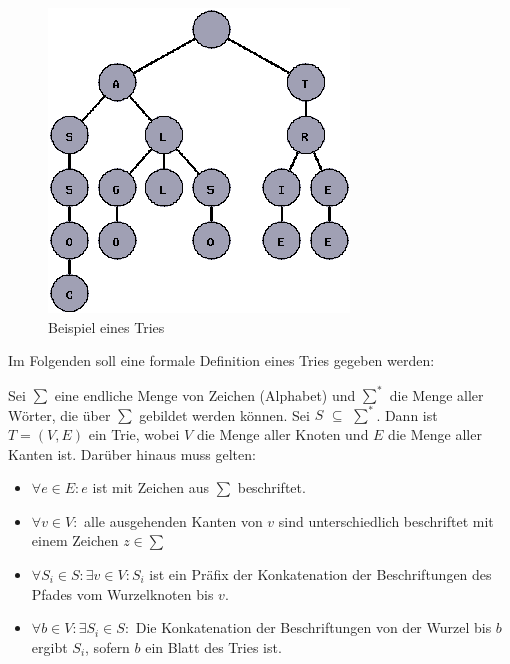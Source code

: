 \begin{figure}[H]
	\centering
	\includegraphics[scale=0.7]{../Abbildungen/trie.png}
	\caption{Beispiel eines Tries \cite{trie_Abb}}
\end{figure}

\newpage
Im Folgenden soll eine formale Definition eines Tries gegeben werden:
\newline
\begin{defi}
	Sei $\sum$ eine endliche Menge von Zeichen (Alphabet) und $\sum^{*}$ die Menge aller Wörter, die über $\sum$ gebildet werden können. Sei $S$ $\subseteq$ $\sum^{*}$. Dann ist $T = (V, E)$ ein Trie, wobei $V$ die Menge aller Knoten und $E$ die Menge aller Kanten ist. Darüber hinaus muss gelten:
	
	\begin{itemize}
		\item $\forall e \in E: e$ ist mit Zeichen aus $\sum$ beschriftet.
		\item $\forall v \in V:$ alle ausgehenden Kanten von $v$ sind unterschiedlich beschriftet mit einem Zeichen $z \in \sum$
		\item $\forall S_i \in S: \exists v \in V: S_i$ ist ein Präfix der Konkatenation der Beschriftungen des Pfades vom Wurzelknoten bis $v$.
		\item $\forall b \in V: \exists S_i \in S:$ Die Konkatenation der Beschriftungen von der Wurzel bis $b$ ergibt $S_i$, sofern $b$ ein Blatt des Tries ist.
	\end{itemize}
\end{defi}

